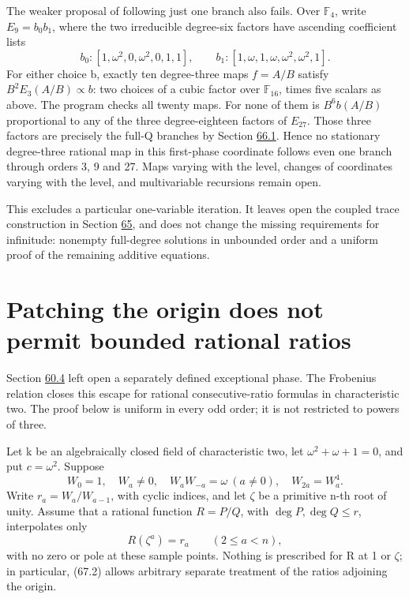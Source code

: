 \documentclass[11pt,reqno]{amsart}
\theoremstyle{plain}
\begin{document}
The weaker proposal of following just one branch also fails. Over
\(\mathbb F_4\), write \(E_9=b_0b_1\), where the two irreducible
degree-six factors have ascending coefficient lists
\[
 b_0:[1,\omega^2,0,\omega^2,0,1,1],\qquad
 b_1:[1,\omega,1,\omega,\omega^2,\omega^2,1].
\]
For either choice b, exactly ten degree-three maps \(f=A/B\)
satisfy \(B^2E_3(A/B)\propto b\): two choices of a cubic factor
over \(\mathbb F_{16}\), times five scalars as above. The program
checks all twenty maps. For none of them is \(B^6b(A/B)\)
proportional to any of the three degree-eighteen factors of
\(E_{27}\). Those three factors are precisely the full-Q branches
by Section \hyperref[sec:66.1]{66.1}. Hence no stationary degree-three rational map in
this first-phase coordinate follows even one branch through
orders 3, 9 and 27. Maps varying with the level, changes of coordinates
varying with the level, and multivariable recursions remain open.

This excludes a particular one-variable iteration. It leaves open
the coupled trace construction in Section \hyperref[sec:65]{65}, and does not change
the missing requirements for infinitude: nonempty full-degree
solutions in unbounded order and a uniform proof of the remaining
additive equations.

\section{Patching the origin does not permit bounded rational ratios}\label{sec:67}

Section \hyperref[sec:60.4]{60.4} left open a separately defined exceptional phase. The
Frobenius relation closes this escape for rational consecutive-ratio
formulas in characteristic two. The proof below is uniform in every
odd order; it is not restricted to powers of three.

Let k be an algebraically closed field of characteristic two, let
\(\omega^2+\omega+1=0\), and put \(c=\omega^2\). Suppose
\begin{equation*}
 W_0=1,\quad W_a\ne0,\quad W_aW_{-a}=\omega\ (a\ne0),
 \quad W_{2a}=W_a^4.
 \tag{67.1}
\end{equation*}
Write \(r_a=W_a/W_{a-1}\), with cyclic indices, and let \(\zeta\)
be a primitive n-th root of unity. Assume that a rational function
\(R=P/Q\), with \(\deg P,\deg Q\le r\), interpolates only
\begin{equation*}
 R(\zeta^a)=r_a\qquad(2\le a<n),
 \tag{67.2}
\end{equation*}
with no zero or pole at these sample points. Nothing is prescribed
for R at 1 or \(\zeta\); in particular, (67.2) allows arbitrary
separate treatment of the ratios adjoining the origin.
\end{document}
